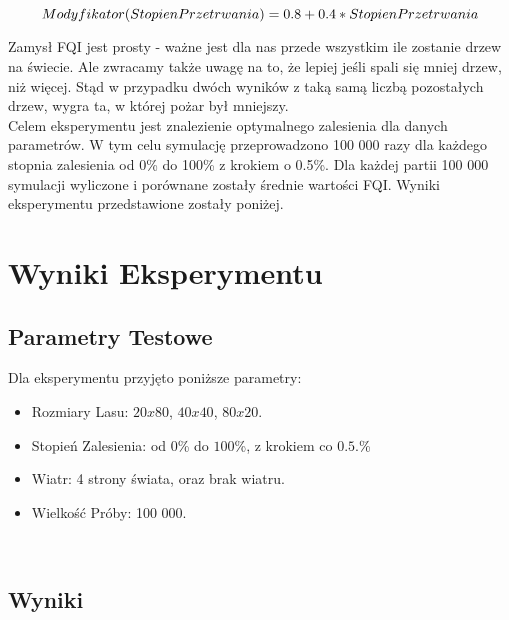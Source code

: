 \documentclass{article}
\begin{document}
\[
Modyfikator(StopienPrzetrwania) = 0.8 + 0.4 * StopienPrzetrwania\\
\]

Zamysł FQI jest prosty - ważne jest dla nas przede wszystkim ile zostanie drzew na świecie. Ale zwracamy także uwagę na to, że lepiej jeśli spali się mniej drzew, niż więcej. Stąd w przypadku dwóch wyników z taką samą liczbą pozostałych drzew, wygra ta, w której pożar był mniejszy.\vspace{2ex}\\

Celem eksperymentu jest znalezienie optymalnego zalesienia dla danych parametrów. W tym celu symulację przeprowadzono 100 000 razy dla każdego stopnia zalesienia od 0\% do 100\% z krokiem o 0.5\%. Dla każdej partii 100 000 symulacji wyliczone i porównane zostały średnie wartości FQI. Wyniki eksperymentu przedstawione zostały poniżej.\\


\section{Wyniki Eksperymentu}
\subsection{Parametry Testowe}
Dla eksperymentu przyjęto poniższe parametry:\\
\begin{itemize}
  \item Rozmiary Lasu: $20x80$, $40x40$, $80x20$.
  \item Stopień Zalesienia: od $0$\% do $100$\%, z krokiem co $0.5$.\%
  \item Wiatr: 4 strony świata, oraz brak wiatru.
  \item Wielkość Próby: 100 000.
\end{itemize}\\

\subsection{Wyniki}
\end{document}
